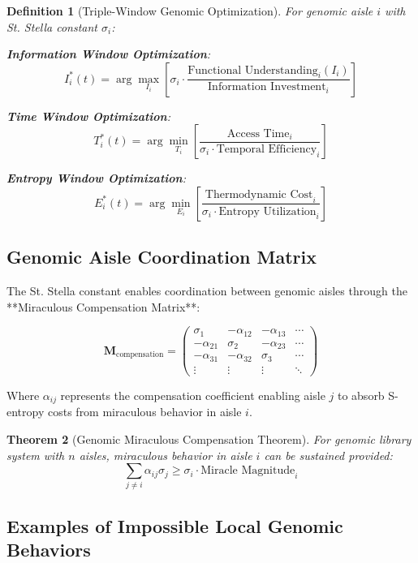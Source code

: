 \documentclass[12pt,a4paper]{article}
\newtheorem{theorem}{Theorem}[section]
\newtheorem{definition}[theorem]{Definition}
\begin{document}
\begin{definition}[Triple-Window Genomic Optimization]
For genomic aisle $i$ with St. Stella constant $\sigma_i$:

\textbf{Information Window Optimization}:
$$I_i^*(t) = \arg\max_{I_i} \left[\sigma_i \cdot \frac{\text{Functional Understanding}_i(I_i)}{\text{Information Investment}_i}\right]$$

\textbf{Time Window Optimization}:
$$T_i^*(t) = \arg\min_{T_i} \left[\frac{\text{Access Time}_i}{\sigma_i \cdot \text{Temporal Efficiency}_i}\right]$$

\textbf{Entropy Window Optimization}:
$$E_i^*(t) = \arg\min_{E_i} \left[\frac{\text{Thermodynamic Cost}_i}{\sigma_i \cdot \text{Entropy Utilization}_i}\right]$$
\end{definition}

\subsection{Genomic Aisle Coordination Matrix}

The St. Stella constant enables coordination between genomic aisles through the **Miraculous Compensation Matrix**:

\begin{equation}
\mathbf{M}_{\text{compensation}} = \begin{pmatrix}
\sigma_1 & -\alpha_{12} & -\alpha_{13} & \cdots \\
-\alpha_{21} & \sigma_2 & -\alpha_{23} & \cdots \\
-\alpha_{31} & -\alpha_{32} & \sigma_3 & \cdots \\
\vdots & \vdots & \vdots & \ddots
\end{pmatrix}
\end{equation}

Where $\alpha_{ij}$ represents the compensation coefficient enabling aisle $j$ to absorb S-entropy costs from miraculous behavior in aisle $i$.

\begin{theorem}[Genomic Miraculous Compensation Theorem]
For genomic library system with $n$ aisles, miraculous behavior in aisle $i$ can be sustained provided:
$$\sum_{j \neq i} \alpha_{ij} \sigma_j \geq \sigma_i \cdot \text{Miracle Magnitude}_i$$
\end{theorem}

\subsection{Examples of Impossible Local Genomic Behaviors}
\end{document}
